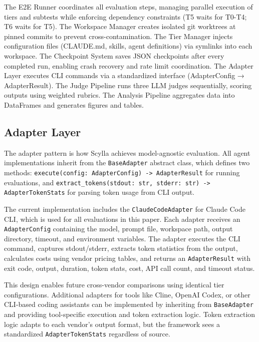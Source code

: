 \documentclass[11pt]{article}
\begin{document}
The E2E Runner coordinates all evaluation steps, managing parallel execution of tiers and subtests while enforcing dependency constraints (T5 waits for T0-T4; T6 waits for T5). The Workspace Manager creates isolated git worktrees at pinned commits to prevent cross-contamination. The Tier Manager injects configuration files (CLAUDE.md, skills, agent definitions) via symlinks into each workspace. The Checkpoint System saves JSON checkpoints after every completed run, enabling crash recovery and rate limit coordination. The Adapter Layer executes CLI commands via a standardized interface (AdapterConfig → AdapterResult). The Judge Pipeline runs three LLM judges sequentially, scoring outputs using weighted rubrics. The Analysis Pipeline aggregates data into DataFrames and generates figures and tables.

\subsection{Adapter Layer}\label{sec:adapter}

The adapter pattern is how Scylla achieves model-agnostic evaluation. All agent implementations inherit from the \texttt{BaseAdapter} abstract class, which defines two methods: \texttt{execute(config: AdapterConfig) -> AdapterResult} for running evaluations, and \texttt{extract\_tokens(stdout: str, stderr: str) -> AdapterTokenStats} for parsing token usage from CLI output.

The current implementation includes the \texttt{ClaudeCodeAdapter} for Claude Code CLI, which is used for all evaluations in this paper. Each adapter receives an \texttt{AdapterConfig} containing the model, prompt file, workspace path, output directory, timeout, and environment variables. The adapter executes the CLI command, captures stdout/stderr, extracts token statistics from the output, calculates costs using vendor pricing tables, and returns an \texttt{AdapterResult} with exit code, output, duration, token stats, cost, API call count, and timeout status.

This design enables future cross-vendor comparisons using identical tier configurations. Additional adapters for tools like Cline, OpenAI Codex, or other CLI-based coding assistants can be implemented by inheriting from \texttt{BaseAdapter} and providing tool-specific execution and token extraction logic. Token extraction logic adapts to each vendor's output format, but the framework sees a standardized \texttt{AdapterTokenStats} regardless of source.
\end{document}
